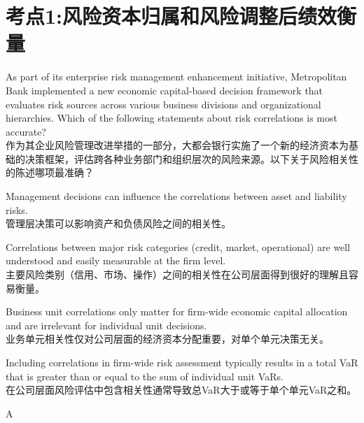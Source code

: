 \documentclass{article}
\newcounter{question} %
\begin{document}
 \tableofcontents %
\newpage





\section{考点1:风险资本归属和风险调整后绩效衡量}
\setcounter{question}{0}
\begin{question}
    As part of its enterprise risk management enhancement initiative, Metropolitan Bank implemented a new economic capital-based decision framework that evaluates risk sources across various business divisions and organizational hierarchies. Which of the following statements about risk correlations is most accurate?\\
    作为其企业风险管理改进举措的一部分，大都会银行实施了一个新的经济资本为基础的决策框架，评估跨各种业务部门和组织层次的风险来源。以下关于风险相关性的陈述哪项最准确？
\end{question}

\begin{choices}
    \item Management decisions can influence the correlations between asset and liability risks.\\
    管理层决策可以影响资产和负债风险之间的相关性。
    \item Correlations between major risk categories (credit, market, operational) are well understood and easily measurable at the firm level.\\
    主要风险类别（信用、市场、操作）之间的相关性在公司层面得到很好的理解且容易衡量。
    \item Business unit correlations only matter for firm-wide economic capital allocation and are irrelevant for individual unit decisions.\\
    业务单元相关性仅对公司层面的经济资本分配重要，对单个单元决策无关。
    \item Including correlations in firm-wide risk assessment typically results in a total VaR that is greater than or equal to the sum of individual unit VaRs.\\
    在公司层面风险评估中包含相关性通常导致总VaR大于或等于单个单元VaR之和。
\end{choices}

\begin{correctanswer}
    A
\end{correctanswer}
\end{document}
